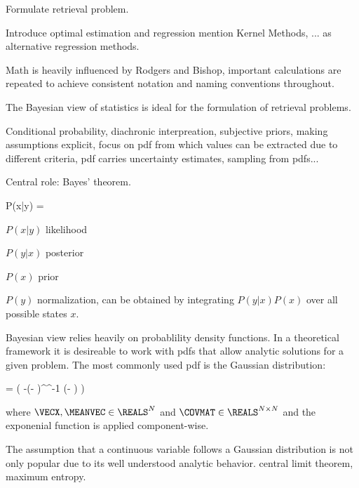 Formulate retrieval problem.

Introduce optimal estimation and regression mention Kernel Methods, ... as
alternative regression methods.

Math is heavily influenced by Rodgers and Bishop, important calculations are
repeated to achieve consistent notation and naming conventions throughout.

\startsection[title=Bayesian Statistics]

    The Bayesian view of statistics is ideal for the formulation of retrieval
    problems. 

    Conditional probability, diachronic interpreation, subjective priors,
    making assumptions explicit, focus on pdf from which values can be
    extracted due to different criteria, pdf carries uncertainty estimates,
    sampling from pdfs...

    Central role: Bayes' theorem.
    
    \startformula
        P(x|y) = 
    \stopformula

    $P(x|y)$ likelihood

    $P(y|x)$ posterior

    $P(x)$ prior

    $P(y)$ normalization, can be obtained by integrating $P(y|x)P(x)$
    over all possible states $x$.

\stopsection

\startsection[title=The Multivariate Gaussian Distribution]

    Bayesian view relies heavily on probablility density functions. In a
    theoretical framework it is desireable to work with pdfs that allow
    analytic solutions for a given problem. The most commonly used pdf is the
    Gaussian distribution:

    \startformula
        \GAUSS{\VECX}{\MEANVEC}{\COVMAT}
        = 
          \exp \left( -(\VECX - \MEANVEC)^\top \COVMAT^{-1} (\VECX - \MEANVEC) \right)
    \stopformula

    where $\VECX, \MEANVEC \in \REALS^N$ and $\COVMAT \in \REALS^{N
    \times N}$ and the exponenial function is applied component-wise.

    The assumption that a continuous variable follows a Gaussian distribution
    is not only popular due to its well understood analytic behavior. central
    limit theorem, maximum entropy.

